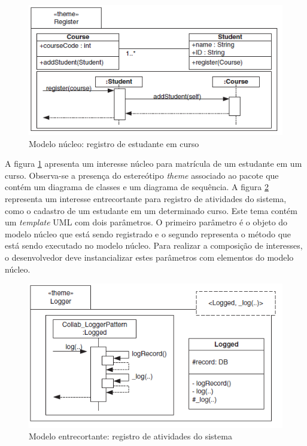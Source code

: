 \begin{figure}
	\centering
	\includegraphics[scale=0.8]{img/theme_1.png}
	\caption{Modelo núcleo: registro de estudante em curso}\label{fig:theme_1}
\end{figure}

A figura \ref{fig:theme_1} apresenta um interesse núcleo para matrícula de um estudante em um curso. Observa-se a presença do estereótipo
\textit{theme} associado ao pacote que contém um diagrama de classes e um diagrama de sequência. A figura \ref{fig:theme_2} representa um interesse
entrecortante para registro de atividades do sistema, como o cadastro de um estudante em um determinado curso. Este tema contém um \textit{template}
UML com dois parâmetros. O primeiro parâmetro é o objeto do modelo núcleo que está sendo registrado e o segundo representa o método que está sendo
executado no modelo núcleo. Para realizar a composição de interesses, o desenvolvedor deve instancializar estes parâmetros com elementos do modelo
núcleo.

\begin{figure}
	\centering
	\includegraphics[scale=0.8]{img/theme_2.png}
	\caption{Modelo entrecortante: registro de atividades do sistema}\label{fig:theme_2}
\end{figure}

